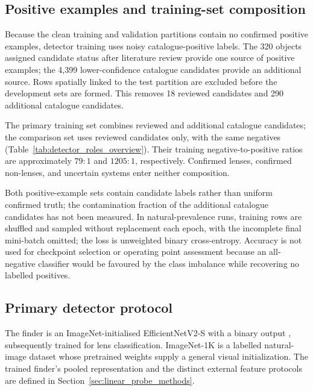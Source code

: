 \subsection{Positive examples and training-set composition}
\label{sec:training_sets}

Because the clean training and validation partitions contain no confirmed
positive examples, detector training uses noisy catalogue-positive labels.
The 320 objects assigned candidate status after literature review provide one
source of positive examples; the 4,399 lower-confidence catalogue candidates
provide an additional source. Rows spatially linked to the test partition are
excluded before the development sets are formed. This removes 18 reviewed
candidates and 290 additional catalogue candidates.

The primary training set combines reviewed and additional catalogue candidates;
the comparison set uses reviewed candidates only, with the same negatives
(Table~\ref{tab:detector_roles_overview}). Their training negative-to-positive
ratios are approximately \(79{:}1\) and \(1205{:}1\), respectively. Confirmed
lenses, confirmed non-lenses, and uncertain systems enter neither composition.

Both positive-example sets contain candidate labels rather than uniform
confirmed truth; the contamination fraction of the additional catalogue
candidates has not been measured.
In natural-prevalence runs, training rows are shuffled and sampled without
replacement each epoch, with the incomplete final mini-batch omitted; the
loss is unweighted binary cross-entropy. Accuracy is not used for checkpoint
selection or operating point assessment because an all-negative classifier
would be favoured by the class imbalance while recovering no labelled
positives.

\subsection{Primary detector protocol}
\label{sec:detector_training}

The finder is an ImageNet-initialised EfficientNetV2-S with a binary output
\citep{Deng2009,Russakovsky2015,TanLe2021}, subsequently trained for lens
classification. ImageNet-1K is a labelled natural-image dataset whose pretrained
weights supply a general visual initialization. The trained finder's pooled
representation and the distinct external feature protocols are defined in
Section~\ref{sec:linear_probe_methods}.

